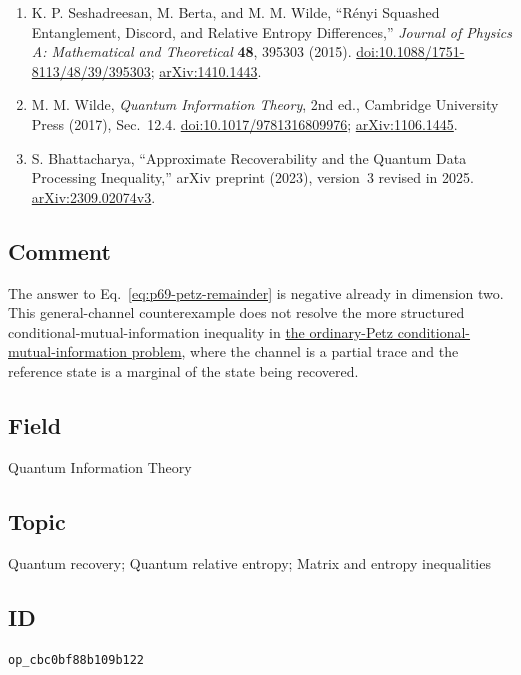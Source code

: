 \begin{enumerate}[label={},leftmargin=4.8em,labelsep=0.5em]
  \footnotesize
  \item[\textup{[SBW15]}]\label{ref:p69-seshadreesan-berta-wilde}
  K. P. Seshadreesan, M. Berta, and M. M. Wilde,
  ``R\'enyi Squashed Entanglement, Discord, and Relative Entropy
  Differences,'' \emph{Journal of Physics A: Mathematical and Theoretical}
  \textbf{48}, 395303 (2015).
  \href{https://doi.org/10.1088/1751-8113/48/39/395303}{doi:10.1088/1751-8113/48/39/395303};
  \href{https://arxiv.org/abs/1410.1443}{arXiv:1410.1443}.

  \item[\textup{[Wil17]}]\label{ref:p69-wilde}
  M. M. Wilde, \emph{Quantum Information Theory}, 2nd ed., Cambridge
  University Press (2017), Sec.~12.4.
  \href{https://doi.org/10.1017/9781316809976}{doi:10.1017/9781316809976};
  \href{https://arxiv.org/abs/1106.1445}{arXiv:1106.1445}.

  \item[\textup{[Bha25]}]\label{ref:p69-bhattacharya}
  S. Bhattacharya, ``Approximate Recoverability and the Quantum Data
  Processing Inequality,'' arXiv preprint (2023), version~3 revised in 2025.
  \href{https://arxiv.org/abs/2309.02074v3}{arXiv:2309.02074v3}.
\end{enumerate}

\subsection*{Comment}

The answer to Eq.~\eqref{eq:p69-petz-remainder} is negative already in
dimension two.  This general-channel counterexample does not resolve the
more structured conditional-mutual-information inequality in
\href{https://qiqc-op.com/problem/op_87c77263c8bab523/}{the ordinary-Petz conditional-mutual-information problem},
where the channel is a partial trace and the reference state is a marginal
of the state being recovered.

\subsection*{Field}

Quantum Information Theory

\subsection*{Topic}

Quantum recovery; Quantum relative entropy; Matrix and entropy inequalities

\subsection*{ID}

\texttt{op\_cbc0bf88b109b122}
